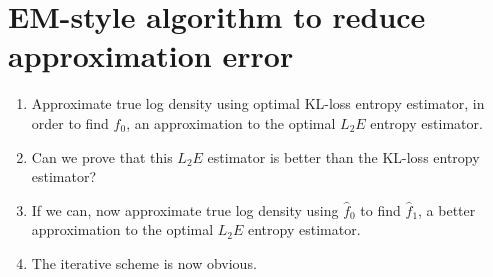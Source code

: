 \documentclass{article}
\begin{document}
  \section{EM-style algorithm to reduce approximation error}
  \begin{enumerate}
  \item Approximate true log density using optimal KL-loss entropy estimator, in order to find $\hat{f}_0$, an approximation to the optimal $L_2E$ entropy estimator.
  \item Can we prove that this $L_2E$ estimator is better than the KL-loss entropy estimator?
  \item If we can, now approximate true log density using $\hat{f}_0$ to find $\hat{f}_1$, a better approximation to the optimal $L_2E$ entropy estimator.
  \item The iterative scheme is now obvious.
  \end{enumerate}
    
\end{document}
